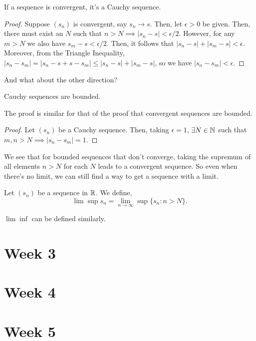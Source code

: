 \documentclass{book}
\begin{document}
\begin{lemma}
    If a sequence is convergent, it's a Cauchy sequence.
\end{lemma}

\begin{proof}
    Suppose $(s_n)$ is convergent, say $s_n \to s$. Then, let $\epsilon > 0$ be given. Then, there must exist an $N$ such that $n > N \implies |s_n - s| < \epsilon/2$. However, for any $m > N$ we also have $s_m - s < \epsilon/2$. Then, it follows that $|s_n - s| + |s_m - s| < \epsilon$. Moreover, from the Triangle Inequality, $|s_n - s_m| = |s_n - s + s - s_m| \leq |s_n - s| + |s_m - s|$, so we have $|s_n - s_m| < \epsilon$.
\end{proof} 

And what about the other direction?
\begin{lemma}
    Cauchy sequences are bounded.
\end{lemma}

The proof is similar for that of the proof that convergent sequences are bounded.

\begin{proof}
    Let $(s_n)$ be a Cauchy sequence. Then, taking $\epsilon = 1$, $\exists N \in \mathbb{N}$ such that $m, n > N \implies |s_n - s_m| = 1$. 
\end{proof}

We see that for bounded sequences that don't converge, taking the supremum of all elements $n > N$ for each $N$ leads to a convergent sequence. So even when there's no limit, we can still find a way to get a sequence with a limit.

\begin{defn}[$\lim \sup$]
    Let $(s_n)$ be a sequence in $\mathbb{R}$. We define,
    \[\lim \sup s_n = \lim_{n \to \infty} \sup \{s_n : n > N\}.\] 

    $\lim \inf$ can be defined similarly.
\end{defn}

\chapter{Week 3}

\chapter{Week 4}

\chapter{Week 5}
\end{document}

